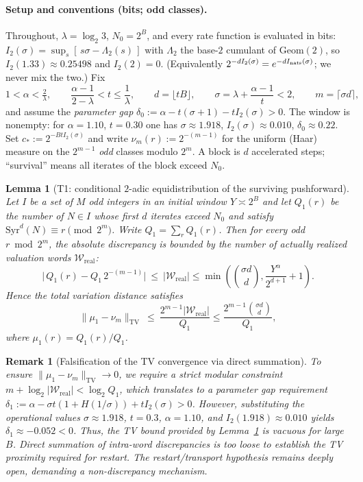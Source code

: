 \documentclass[12pt,a4paper]{article}
\newtheorem{lemma}[theorem]{Lemma}
\newtheorem{remark}[theorem]{Remark}
\begin{document}
\paragraph{Setup and conventions (bits; odd classes).}
Throughout, $\lambda=\log_2 3$, $N_0=2^B$, and every rate function is evaluated
in bits: $I_2(\sigma)=\sup_{s}[\,s\sigma-\Lambda_2(s)\,]$ with $\Lambda_2$ the
base-$2$ cumulant of $\mathrm{Geom}(2)$, so $I_2(1.33)\approx0.25498$ and
$I_2(2)=0$. (Equivalently $2^{-dI_2(\sigma)}=e^{-dI_{\rm nats}(\sigma)}$; we never
mix the two.) Fix
\[
1<\alpha<\tfrac2\lambda,\qquad
\frac{\alpha-1}{2-\lambda}<t\le\frac1\lambda,\qquad
d=\lfloor tB\rfloor,\qquad
\sigma=\lambda+\frac{\alpha-1}{t}<2,\qquad m=\lceil\sigma d\rceil,
\]
and assume the \emph{parameter gap}
$\delta_0:=\alpha-t(\sigma+1)-tI_2(\sigma)>0$.
The window is nonempty: for $\alpha=1.10$, $t=0.30$ one has
$\sigma\approx1.918$, $I_2(\sigma)\approx0.010$, $\delta_0\approx0.22$.
Set $c_*:=2^{-BtI_2(\sigma)}$ and write $\nu_m(r):=2^{-(m-1)}$ for the uniform
(Haar) measure on the $2^{m-1}$ \emph{odd} classes modulo $2^m$.
A block is $d$ accelerated steps; ``survival'' means all iterates of the block
exceed $N_0$.

\begin{lemma}[T1: conditional $2$-adic equidistribution of the surviving pushforward]
\label{lem:T1}
Let $I$ be a set of $M$ odd integers in an initial window $Y \asymp 2^B$ and let $Q_1(r)$ be the number of
$N\in I$ whose first $d$ iterates exceed $N_0$ and satisfy
$\mathrm{Syr}^d(N)\equiv r\pmod{2^m}$. Write $Q_1=\sum_r Q_1(r)$. Then for
every odd $r\bmod 2^m$, the absolute discrepancy is bounded by the number of actually realized valuation words $\mathcal{W}_{\text{real}}$:
\[
\big|\,Q_1(r)-Q_1\,2^{-(m-1)}\big|\ \le\ |\mathcal{W}_{\text{real}}| \le \min\left(\binom{\sigma d}{d}, \frac{Y^\alpha}{2^{d+1}}+1\right).
\]
Hence the total variation distance satisfies
\[
\|\mu_1-\nu_m\|_{\mathrm{TV}}\ \le\ \frac{2^{m-1} |\mathcal{W}_{\text{real}}|}{Q_1} \le \frac{2^{m-1} \binom{\sigma d}{d}}{Q_1},
\]
where $\mu_1(r)=Q_1(r)/Q_1$. 
\end{lemma}

\begin{remark}[Falsification of the TV convergence via direct summation]
To ensure $\|\mu_1-\nu_m\|_{\mathrm{TV}} \to 0$, we require a strict modular constraint $m + \log_2|\mathcal{W}_{\text{real}}| < \log_2 Q_1$, which translates to a parameter gap requirement $\delta_1 := \alpha - \sigma t(1 + H(1/\sigma)) + t I_2(\sigma) > 0$. However, substituting the operational values $\sigma \approx 1.918$, $t = 0.3$, $\alpha = 1.10$, and $I_2(1.918) \approx 0.010$ yields $\delta_1 \approx -0.052 < 0$. Thus, the TV bound provided by Lemma~\ref{lem:T1} is \emph{vacuous} for large $B$. Direct summation of intra-word discrepancies is too loose to establish the TV proximity required for restart. The restart/transport hypothesis remains deeply open, demanding a non-discrepancy mechanism.
\end{remark}
\end{document}
